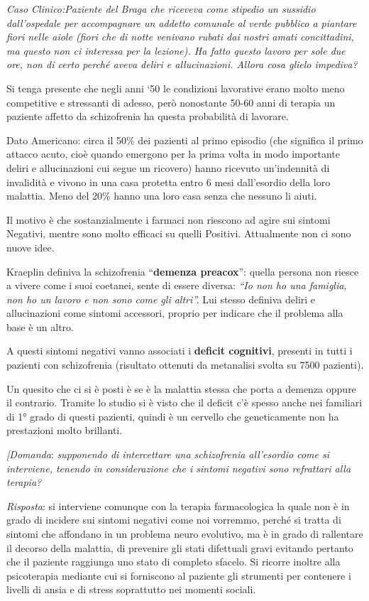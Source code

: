 \documentclass[]{article}
\begin{document}
\emph{\emph{Caso Clinico:Paziente del Braga che riceveva come stipedio
un sussidio dall'ospedale per accompagnare un addetto comunale al verde
pubblico a piantare fiori nelle aiole (fiori che di notte venivano
rubati dai nostri amati concittadini, ma questo non ci interessa per la
lezione). Ha fatto questo lavoro per sole due ore, non di certo perché
aveva deliri e allucinazioni. Allora cosa glielo impediva?}}

Si tenga presente che negli anni `50 le condizioni lavorative erano
molto meno competitive e stressanti di adesso, però nonostante 50-60
anni di terapia un paziente affetto da schizofrenia ha questa
probabilità di lavorare.

Dato Americano: circa il 50\% dei pazienti al primo episodio (che
significa il primo attacco acuto, cioè quando emergono per la prima
volta in modo importante deliri e allucinazioni cui segue un ricovero)
hanno ricevuto un'indennità di invalidità e vivono in una casa protetta
entro 6 mesi dall'esordio della loro malattia. Meno del 20\% hanno una
loro casa senza che nessuno li aiuti.

Il motivo è che sostanzialmente i farmaci non riescono ad agire sui
sintomi Negativi, mentre sono molto efficaci su quelli Positivi.
Attualmente non ci sono nuove idee.

Kraeplin definiva la schizofrenia ``\textbf{demenza preacox}'': quella
persona non riesce a vivere come i suoi coetanei, sente di essere
diversa: \emph{``Io non ho una famiglia, non ho un lavoro e non sono
come gli altri''.} Lui stesso definiva deliri e allucinazioni come
sintomi accessori, proprio per indicare che il problema alla base è un
altro.

A questi sintomi negativi vanno associati i \textbf{deficit cognitivi},
presenti in tutti i pazienti con schizofrenia (risultato ottenuti da
metanalisi svolta su 7500 pazienti).

Un quesito che ci si è posti è se è la malattia stessa che porta a
demenza oppure il contrario. Tramite lo studio si è visto che il deficit
c'è spesso anche nei familiari di 1° grado di questi pazienti, quindi è
un cervello che geneticamente non ha prestazioni molto brillanti.

\emph{{[}Domanda}: \emph{supponendo di intercettare una schizofrenia
all'esordio come si interviene, tenendo in considerazione che i sintomi
negativi sono refrattari alla terapia? }

\emph{Risposta}: si interviene comunque con la terapia farmacologica la
quale non è in grado di incidere sui sintomi negativi come noi vorremmo,
perché si tratta di sintomi che affondano in un problema neuro
evolutivo, ma è in grado di rallentare il decorso della malattia, di
prevenire gli stati difettuali gravi evitando pertanto che il paziente
raggiunga uno stato di completo sfacelo. Si ricorre inoltre alla
psicoterapia mediante cui si forniscono al paziente gli strumenti per
contenere i livelli di ansia e di stress soprattutto nei momenti
sociali.
\end{document}

